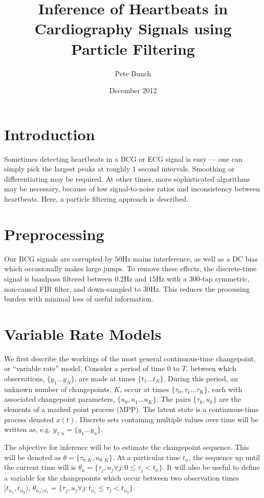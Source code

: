 \documentclass{article}
\title{Inference of Heartbeats in Cardiography Signals using Particle Filtering}
\author{Pete Bunch}
\date{December 2012}
\begin{document}
\maketitle

\section{Introduction}

Sometimes detecting heartbeats in a BCG or ECG signal is easy --- one can simply pick the largest peaks at roughly $1$ second intervals. Smoothing or differentiating may be required. At other times, more sophisticated algorithms may be necessary, because of low signal-to-noise ratios and inconsistency between heartbeats. Here, a particle filtering approach is described.



\section{Preprocessing}

Our BCG signals are corrupted by $50$Hz mains interference, as well as a DC bias which occasionally makes large jumps. To remove these effects, the discrete-time signal is bandpass filtered between $0.2$Hz and $15$Hz with a $300$-tap symmetric, non-causal FIR filter, and down-sampled to $30$Hz. This reduces the processing burden with minimal loss of useful information.



\section{Variable Rate Models}

We first describe the workings of the most general continuous-time changepoint, or ``variable rate'' model. Consider a period of time $0$ to $T$, between which observations, $\{y_1 \dots y_N\}$, are made at times $\{t_1 \dots t_N\}$. During this period, an unknown number of changepoints, $K$, occur at times $\{\tau_0, \tau_1 \dots \tau_K \}$, each with associated changepoint parameters, $\{ u_0, u_1 \dots u_K \}$. The pairs $\{\tau_k, u_k\}$ are the elements of a marked point process (MPP). The latent state is a continuous-time process denoted $x(t)$. Discrete sets containing multiple values over time will be written as, e.g. $y_{1:n} = \{y_1 \dots y_n\}$.

The objective for inference will be to estimate the changepoint sequence. This will be denoted as $\theta = \{\tau_{0:K}, u_{0:K}\}$. At a particular time $t_n$, the sequence up until the current time will is $\theta_n = \{\tau_{j}, u_{j} \forall j : 0 \leq \tau_j < t_n \}$. It will also be useful to define a variable for the changepoints which occur between two observation times $[t_{n_1},t_{n_2})$, $\theta_{n_2 \setminus n_1} = \{\tau_{j}, u_{j} \forall j : t_{n_1} \leq \tau_j < t_{n_2} \}$.
\end{document}
